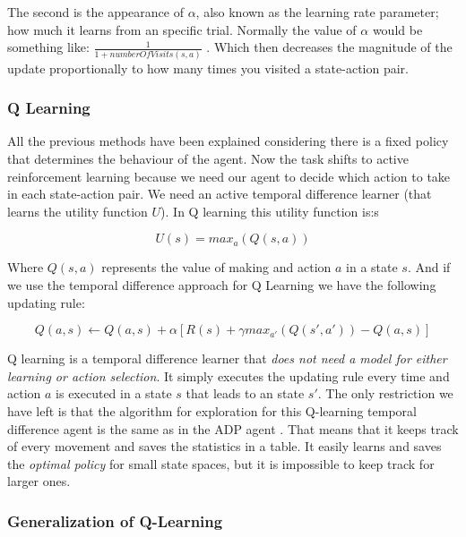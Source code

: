 The second is the appearance of $\alpha$, also known as the learning rate parameter; how much it learns from an specific trial. Normally the value of  $\alpha$ would be something like: $\frac{1}{1+numberOfVisits(s,a)}$ \cite[p382]{ml_tom_mitchel}. Which then decreases the magnitude of the update proportionally to how many times you visited a state-action pair.\\
 

\subsubsection{Q Learning}

All the previous methods have been explained considering there is a fixed policy that determines the behaviour of the agent. Now the task shifts to active reinforcement learning because we need our agent to decide which action to take in each state-action pair. We need an active temporal difference learner (that learns the utility function $U$). In Q learning this utility function is:s\cite{rl}

\begin{equation}
U(s) = max_a(Q(s,a))
\end{equation}

Where $Q(s,a)$ represents the value of making and action $a$ in a state $s$. And if we use the temporal difference approach for Q Learning we have the following updating rule:\cite{rl} 

\begin{equation}
Q(a,s) \leftarrow  Q(a,s)  + \alpha [R(s) + \gamma max_{a'}(Q(s',a')) - Q(a,s)]
\end{equation}

Q learning is a temporal difference learner that \textit{does not need a model for either learning or action selection}\cite[p775]{rl}. It simply executes the updating rule every time and action $a$ is executed in a state $s$ that leads to an state $s'$. The only restriction we have left is that the algorithm for exploration for this Q-learning temporal difference agent is the same as in the ADP agent \cite[p776]{rl} . That means that it keeps track of every movement and saves the statistics in a table. It easily learns and saves the \emph{optimal policy} for small state spaces, but it is impossible to keep track for larger ones. 

\subsubsection{Generalization of Q-Learning}	\label{generalization}


